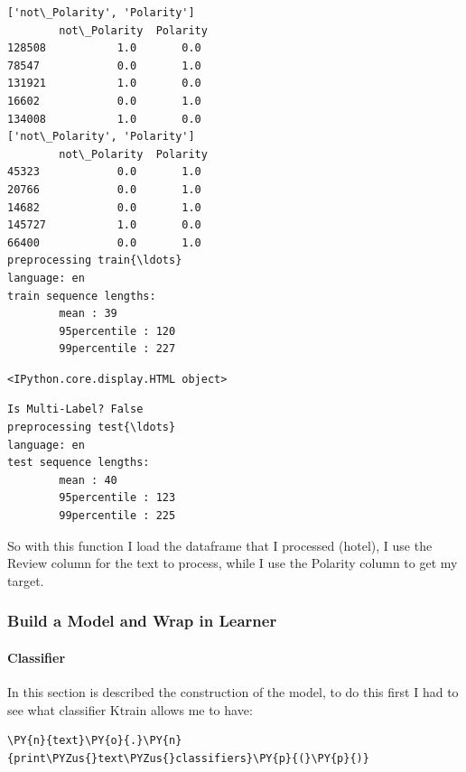 \begin{Verbatim}[commandchars=\\\{\},fontsize=\footnotesize]
['not\_Polarity', 'Polarity']
        not\_Polarity  Polarity
128508           1.0       0.0
78547            0.0       1.0
131921           1.0       0.0
16602            0.0       1.0
134008           1.0       0.0
['not\_Polarity', 'Polarity']
        not\_Polarity  Polarity
45323            0.0       1.0
20766            0.0       1.0
14682            0.0       1.0
145727           1.0       0.0
66400            0.0       1.0
preprocessing train{\ldots}
language: en
train sequence lengths:
        mean : 39
        95percentile : 120
        99percentile : 227
    \end{Verbatim}

    
    \begin{Verbatim}[commandchars=\\\{\},fontsize=\footnotesize]
<IPython.core.display.HTML object>
    \end{Verbatim}

    
    \begin{Verbatim}[commandchars=\\\{\},fontsize=\footnotesize]
Is Multi-Label? False
preprocessing test{\ldots}
language: en
test sequence lengths:
        mean : 40
        95percentile : 123
        99percentile : 225
    \end{Verbatim}
So with this function I load the dataframe that I processed (hotel), I use the Review column for the text to process, while I use the Polarity column to get my target.


\subsubsection{Build a Model and Wrap in Learner}
\paragraph{Classifier}
In this section is described the construction of the model, to do this first I had to see what classifier Ktrain allows me to have:
    \begin{tcolorbox}[breakable, size=fbox, boxrule=1pt, pad at break*=1mm,colback=cellbackground, colframe=cellborder]
\begin{Verbatim}[commandchars=\\\{\},fontsize=\footnotesize]
\PY{n}{text}\PY{o}{.}\PY{n}{print\PYZus{}text\PYZus{}classifiers}\PY{p}{(}\PY{p}{)}
\end{Verbatim}
\end{tcolorbox}

